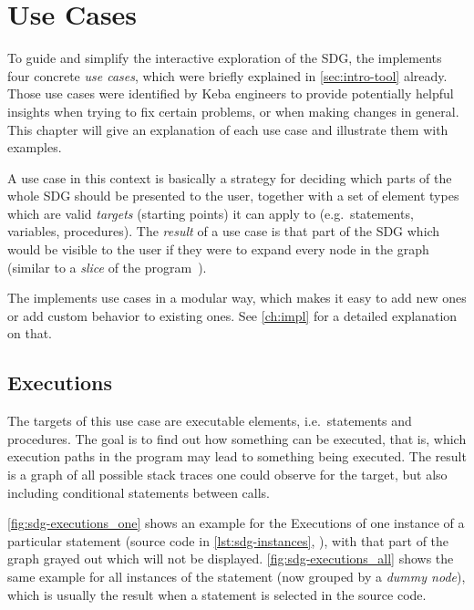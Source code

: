 \chapter{Use Cases} \label{ch:usecases}

To guide and simplify the interactive exploration of the SDG, the \SB implements four concrete \emph{use cases}, which 
were briefly explained in \autoref{sec:intro-tool} already. Those use cases were identified by Keba engineers to 
provide potentially helpful insights when trying to fix certain problems, or when making changes in general. This 
chapter will give an explanation of each use case and illustrate them with examples.

A use case in this context is basically a strategy for deciding which parts of the whole SDG should be presented to the 
user, together with a set of element types which are valid \emph{targets} (starting points) it can apply to (e.g.\ 
statements, variables, procedures). The \emph{result} of a use case is that part of the SDG which would be visible to 
the user if they were to expand every node in the graph (similar to a \emph{slice} of the 
program~\cite{DBLP:journals/tse/Weiser84}).

The \SB implements use cases in a modular way, which makes it easy to add new ones or add custom behavior to existing 
ones. See \autoref{ch:impl} for a detailed explanation on that.


\section{Executions}

The targets of this use case are executable elements, i.e.\ statements and procedures. The goal is to find out how 
something can be executed, that is, which execution paths in the program may lead to something being executed. The 
result is a graph of all possible stack traces one could observe for the target, but also including conditional 
statements between calls.

\autoref{fig:sdg-executions_one} shows an example for the Executions of one instance of a particular statement (source 
code in \autoref{lst:sdg-instances}, \autopageref{lst:sdg-instances}), with that part of the graph grayed out which 
will not be displayed. \autoref{fig:sdg-executions_all} shows the same example for all instances of the statement (now 
grouped by a \emph{dummy node}), which is usually the result when a statement is selected in the source code.

